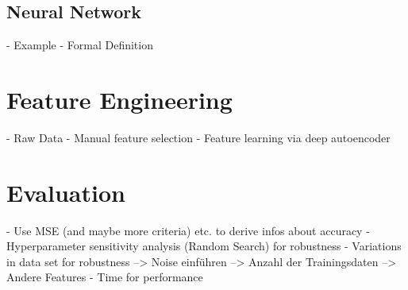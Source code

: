 \subsection{Neural Network}
- Example
- Formal Definition

\section{Feature Engineering}

- Raw Data 
- Manual feature selection
- Feature learning via deep autoencoder

\section{Evaluation} 
- Use MSE (and maybe more criteria) etc. to derive infos about accuracy
- Hyperparameter sensitivity analysis (Random Search) for robustness
- Variations in data set for robustness
--> Noise einführen 
--> Anzahl der Trainingsdaten
--> Andere Features
- Time for performance




















